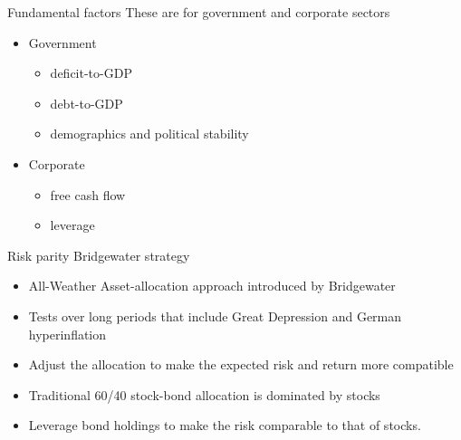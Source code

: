 \documentclass[14pt,xcolor=pdftex,dvipsnames,table]{beamer}\usepackage[]{graphicx}\usepackage[]{color}
\begin{document}
\begin{frame}{Fundamental factors}
These are for government and corporate sectors
\begin{itemize}[<+-| alert@+>]
\pause
\item Government 
\begin{itemize}
\item deficit-to-GDP
\item debt-to-GDP
\item demographics and political stability
\end{itemize}
\item Corporate 
\begin{itemize}
\item free cash flow 
\item leverage
\end{itemize}
\end{itemize}
\end{frame}


\begin{frame}{Risk parity}
Bridgewater strategy
\begin{itemize}[<+-| alert@+>]
\pause
\item All-Weather Asset-allocation approach introduced by Bridgewater
\item Tests over long periods that include Great Depression and German hyperinflation
\item Adjust the allocation to make the expected risk and return more compatible
\item Traditional 60/40 stock-bond allocation is dominated by stocks
\item Leverage bond holdings to make the risk comparable to that of stocks. 
\end{itemize}
\end{frame}
\end{document}
